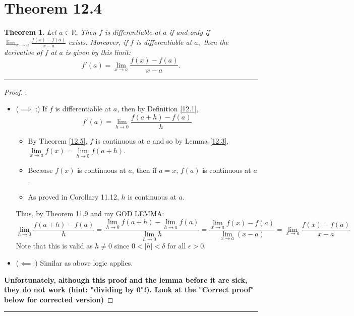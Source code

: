 \documentclass[openany, amssymb, psamsfonts]{amsart}
\newcommand{\bbR}{\mathbb{R}}
\newtheorem{thm}{Theorem}[section]
\theoremstyle{definition}
\numberwithin{equation}{section}
\begin{document}
\section*{Theorem 12.4}
\begin{thm} \label{12.4}Let $a\in \bbR.$
Then	 $f$ is differentiable at $a$ if and only if  $\displaystyle \lim_{x \to a} \frac{f(x) - f(a)}{x - a}$ exists. Moreover, if $f$ is differentiable at $a,$ then the derivative of $f$ at $a$ is given by this limit:
	\[
		f'(a) = \lim_{x \to a} \frac{f(x) - f(a)}{x - a}.
	\]
\end{thm}
 \vspace{4pt}     \hrule   \vspace{4pt} \begin{proof}:\\
 \begin{itemize}
     \item ($\implies$ :) If $f$ is differentiable at $a$, then by Definition \ref{12.1}, 
\[f'(a) = \lim\limits_{h\to 0} \frac{f(a+h)-f(a)}{h}\]
\begin{itemize}
    \item By Theorem \ref{12.5}, $f$ is continuous at $a$ and so by Lemma \ref{12.3}, $\lim\limits_{x\to a} f(x) = \lim\limits_{h\to 0}f(a+h)$.
    \item Because $f(x)$ is continuous at $a$, then if $a=x$, $f(a)$ is continuous at $a$.
    \item As proved in Corollary 11.12, $h$ is continuous at $a$.
\end{itemize}
Thus, by Theorem 11.9 and my GOD LEMMA:
\[\lim\limits_{h\to 0} \frac{f(a+h)-f(a)}{h}=  \frac{\lim\limits_{h\to 0} f(a+h)-\lim\limits_{h\to a}f(a)}{\lim\limits_{h\to 0} h} = \frac{\lim\limits_{x\to a} f(x) - f(a)}{\lim\limits_{x\to a } (x-a)} = \lim\limits_{x\to a} \frac{f(x)-f(a)}{x-a}\] Note that this is valid as $h\neq 0$ since $0<|h|<\delta$ for all $\epsilon>0$. 
\item ($\impliedby$:) Similar as above logic applies.
 \end{itemize}
 \textbf{Unfortunately, although this proof and the lemma before it are sick, they do not work (hint: "dividing by 0"!). Look at the "Correct proof" below for corrected version)}

\end{proof} \vspace{4pt}     \hrule   \vspace{4pt}
\end{document}
